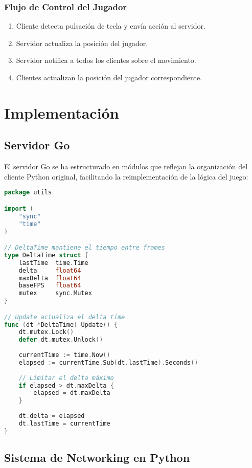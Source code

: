 \documentclass[12pt,letterpaper]{article}
\begin{document}
\subsubsection{Flujo de Control del Jugador}
\begin{enumerate}
    \item Cliente detecta pulsación de tecla y envía acción al servidor.
    \item Servidor actualiza la posición del jugador.
    \item Servidor notifica a todos los clientes sobre el movimiento.
    \item Clientes actualizan la posición del jugador correspondiente.
\end{enumerate}

\section{Implementación}

\subsection{Servidor Go}

El servidor Go se ha estructurado en módulos que reflejan la organización del cliente Python original, facilitando la reimplementación de la lógica del juego:

\begin{lstlisting}[language=go, caption=Ejemplo de implementación del DeltaTime en Go]
package utils

import (
    "sync"
    "time"
)

// DeltaTime mantiene el tiempo entre frames
type DeltaTime struct {
    lastTime  time.Time
    delta     float64
    maxDelta  float64
    baseFPS   float64
    mutex     sync.Mutex
}

// Update actualiza el delta time
func (dt *DeltaTime) Update() {
    dt.mutex.Lock()
    defer dt.mutex.Unlock()
    
    currentTime := time.Now()
    elapsed := currentTime.Sub(dt.lastTime).Seconds()
    
    // Limitar el delta máximo
    if elapsed > dt.maxDelta {
        elapsed = dt.maxDelta
    }
    
    dt.delta = elapsed
    dt.lastTime = currentTime
}
\end{lstlisting}

\subsection{Sistema de Networking en Python}
\end{document}
